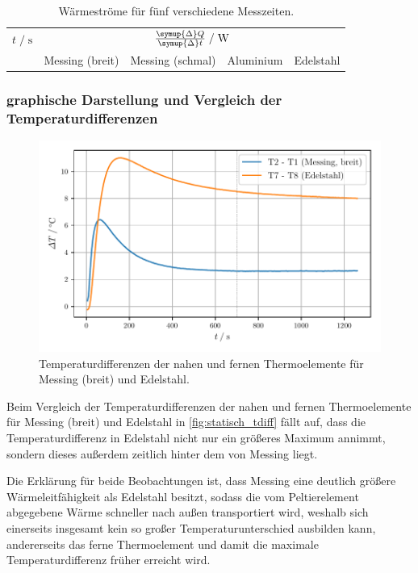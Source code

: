 \begin{table}[H]
     \centering
     \caption{Wärmeströme für fünf verschiedene Messzeiten.}
     \label{tab:waermestroeme}
     \begin{tabular}{r c c c c}
      \toprule
      $t \;/\; \si{\second}$ &
      \multicolumn{4}{c}{$\frac{\symup{\Delta} Q}{\symup{\Delta} t} \;/\; \si{\watt}$} \\
      \cmidrule(lr){2-5}
      &
      Messing (breit) &
      Messing (schmal) &
      Aluminium &
      Edelstahl \\
      \midrule
      
      \bottomrule
     \end{tabular}
\end{table}


\subsubsection{graphische Darstellung und Vergleich der Temperaturdifferenzen}

\begin{figure}[H]
  \centering
  \includegraphics{build/plot_statisch_tdiff.pdf}
  \caption{Temperaturdifferenzen der nahen und fernen Thermoelemente für Messing (breit) und Edelstahl.}
  \label{fig:statisch_tdiff}
\end{figure}

Beim Vergleich der Temperaturdifferenzen der nahen und fernen Thermoelemente für Messing (breit) und Edelstahl in  \autoref{fig:statisch_tdiff} fällt auf,
dass die Temperaturdifferenz in Edelstahl nicht nur ein größeres Maximum annimmt,
sondern dieses außerdem zeitlich hinter dem von Messing liegt.

Die Erklärung für beide Beobachtungen ist,
dass Messing eine deutlich größere Wärmeleitfähigkeit als Edelstahl besitzt,
sodass die vom Peltierelement abgegebene Wärme schneller nach außen transportiert wird,
weshalb sich einerseits insgesamt kein so großer Temperaturunterschied ausbilden kann,
andererseits das ferne Thermoelement und damit die maximale Temperaturdifferenz früher erreicht wird.

